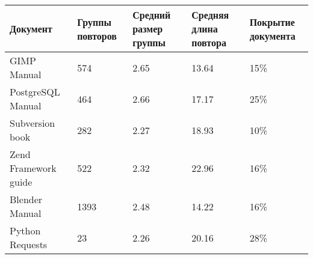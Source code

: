 \begin{minipage}{0.9\textwidth}
\begin{adjustbox}{center}
\begin{tabular}{|l||m{}|m{}|m{}|m{}|}
	\hline
	Документ & Группы повторов & Средний размер группы & Средняя длина повтора & Покрытие документа \\
	\hline
	\hline
	GIMP Manual & 574 & 2.65 & 13.64 & 15\% \\
	\hline
	PostgreSQL Manual & 464 & 2.66 & 17.17 & 25\% \\
	\hline
	Subversion book & 282 & 2.27 & 18.93 & 10\% \\
	\hline
	Zend Framework guide & 522 & 2.32 & 22.96 & 16\% \\
	\hline
	Blender Manual & 1393 & 2.48 & 14.22 & 16\% \\
	\hline
	Python Requests & 23 & 2.26 & 20.16 & 28\% \\
	\hline
\end{tabular}
\end{adjustbox}
\end{minipage}